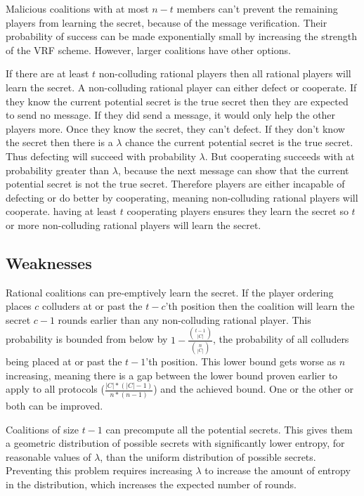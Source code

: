 \documentclass{dalcsthesis}
\begin{document}
Malicious coalitions with at most $n-t$ members can't prevent the remaining players from learning the secret, because of the message verification. Their probability of success can be made exponentially small by increasing the strength of the VRF scheme. However, larger coalitions have other options. 

If there are at least $t$ non-colluding rational players then all rational players will learn the secret. A non-colluding rational player can either defect or cooperate. If they know the current potential secret is the true secret then they are expected to send no message. If they did send a message, it would only help the other players more. Once they know the secret, they can't defect. If they don't know the secret then there is a $\lambda$ chance the current potential secret is the true secret. Thus defecting will succeed with probability $\lambda$. But cooperating succeeds with at probability greater than $\lambda$, because the next message can show that the current potential secret is not the true secret. Therefore players are either incapable of defecting or do better by cooperating, meaning non-colluding rational players will cooperate. having at least $t$ cooperating players ensures they learn the secret so $t$ or more non-colluding rational players will learn the secret.

\subsection{Weaknesses}

Rational coalitions can pre-emptively learn the secret. If the player ordering places $c$ colluders at or past the $t-c$'th position then the coalition will learn the secret $c-1$ rounds earlier than any non-colluding rational player. This probability is bounded from below by $1 - \frac{{t - 1 \choose |C|}}{{n \choose |C|}}$, the probability of all colluders being placed at or past the $t-1$'th position. This lower bound gets worse as $n$ increasing, meaning there is a gap between the lower bound proven earlier to apply to all protocols ($\frac{|C|*(|C|-1)}{n*(n-1)}$) and the achieved bound. One or the other or both can be improved.

Coalitions of size $t-1$ can precompute all the potential secrets. This gives them a geometric distribution of possible secrets with significantly lower entropy, for reasonable values of $\lambda$, than the uniform distribution of possible secrets. Preventing this problem requires increasing $\lambda$ to increase the amount of entropy in the distribution, which increases the expected number of rounds.
\end{document}
